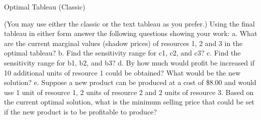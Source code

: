 \documentclass[answers]{exam}
\begin{document}
\begin{questions}
Optimal Tableau (Classic)

(You may use either the classic or the text tableau as you prefer.)
Using the final tableau in either form answer the following questions showing your work:
a. What are the current marginal values (shadow prices) of resources 1, 2 and 3 in the optimal tableau?
b. Find the sensitivity range for c1, c2, and c3?
c. Find the sensitivity range for b1, b2, and b3?
d. By how much would profit be increased if 10 additional units of resource 1 could be obtained? What would be the new solution?
e. Suppose a new product can be produced at a cost of \$8.00 and would use 1 unit of resource 1, 2 units of resource 2 and 2 units of resource 3. Based on the current optimal solution, what is the minimum selling price that could be set if the new product is to be profitable to produce?


\question
{}


\end{questions}
\end{document}

